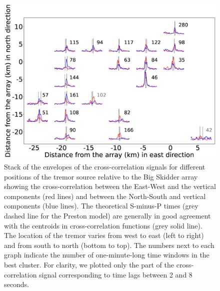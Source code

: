 \documentclass[draft]{agujournal2019}
\begin{document}
\begin{figure}
\noindent\includegraphics[width=\textwidth, trim={2.5cm 0.5cm 5cm 1cm},clip]{figures/BS_PWS_PWS_0.eps}
\caption{Stack of the envelopes of the cross-correlation signals for different positions of the tremor source relative to the Big Skidder array showing the cross-correlation between the East-West and the vertical components (red lines) and between the North-South and vertical components (blue lines). The theoretical S-minus-P times (grey dashed line for the Preston model) are generally in good agreement with the centroids in cross-correlation functions (grey solid line). The location of the tremor varies from west to east (left to right) and from south to north (bottom to top). The numbers next to each graph indicate the number of one-minute-long time windows in the best cluster. For clarity, we plotted only the part of the cross-correlation signal corresponding to time lags between 2 and 8 seconds.}
\label{pngfiguresample}
\end{figure}
\end{document}
